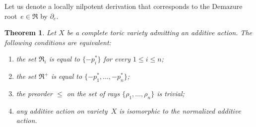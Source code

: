 \documentclass[a4paper,reqno,12pt]{amsart}
\newtheorem{theorem}{Theorem}
\theoremstyle{definition}
\begin{document}
Let us denote a locally nilpotent derivation that corresponds to the Demazure root~${e\in \mathfrak R}$ by $\partial_{e}$.

\begin{theorem}\label{maintheorem}
  Let $X$ be a complete toric variety admitting an additive action.
  The following conditions are equivalent:
  \begin{enumerate}
  \item the set $\mathfrak R_i$ is equal to $\{-p_i^*\}$ for every $1 \leq i\leq n$;
  \item the set $\mathfrak R^+$ is equal to $\{-p_1^*, \ldots, -p_n^*\}$;
  \item the preorder $\leq$ on the set of rays  $\{\rho_1, \ldots, \rho_n\}$ is trivial;
  \item any additive action on variety~$X$ is isomorphic to the normalized additive action.
  \end{enumerate}
\end{theorem}
\end{document}
